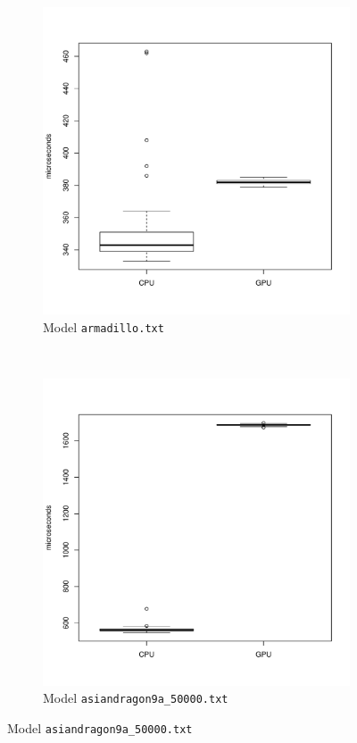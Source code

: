 	\begin{figure}
		\centering
		\begin{subfigure}[b]{0.45\textwidth}
			\includegraphics[width=\textwidth]{results/armadillo}
			\caption{Model \texttt{armadillo.txt}}
		\end{subfigure}
		~%
		\begin{subfigure}[b]{0.45\textwidth}
			\includegraphics[width=\textwidth]{results/asiandragon9a_50000}
			\caption{Model \texttt{asiandragon9a\_50000.txt}}
		\end{subfigure}
		

\end{figure}
